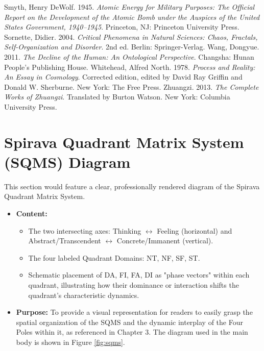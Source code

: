 \documentclass[11pt, a4paper]{article}
\begin{document}
\begin{thebibliography}{99}
 Smyth, Henry DeWolf. 1945. \textit{Atomic Energy for Military Purposes: The Official Report on the Development of the Atomic Bomb under the Auspices of the United States Government, 1940–1945}. Princeton, NJ: Princeton University Press.
 Sornette, Didier. 2004. \textit{Critical Phenomena in Natural Sciences: Chaos, Fractals, Self-Organization and Disorder}. 2nd ed. Berlin: Springer-Verlag.
 Wang, Dongyue. 2011. \textit{The Decline of the Human: An Ontological Perspective}. Changsha: Hunan People's Publishing House.
 Whitehead, Alfred North. 1978. \textit{Process and Reality: An Essay in Cosmology}. Corrected edition, edited by David Ray Griffin and Donald W. Sherburne. New York: The Free Press.
 Zhuangzi. 2013. \textit{The Complete Works of Zhuangzi}. Translated by Burton Watson. New York: Columbia University Press.

\end{thebibliography}

\appendix
\section{Spirava Quadrant Matrix System (SQMS) Diagram}
This section would feature a clear, professionally rendered diagram of the Spirava Quadrant Matrix System.
\begin{itemize}
    \item \textbf{Content:}
    \begin{itemize}
        \item The two intersecting axes: Thinking $\leftrightarrow$ Feeling (horizontal) and Abstract/Transcendent $\leftrightarrow$ Concrete/Immanent (vertical).
        \item The four labeled Quadrant Domains: NT, NF, SF, ST.
        \item Schematic placement of DA, FI, FA, DI as "phase vectors" within each quadrant, illustrating how their dominance or interaction shifts the quadrant's characteristic dynamics.
    \end{itemize}
    \item \textbf{Purpose:} To provide a visual representation for readers to easily grasp the spatial organization of the SQMS and the dynamic interplay of the Four Poles within it, as referenced in Chapter 3. The diagram used in the main body is shown in Figure \ref{fig:sqms}.
\end{itemize}
\end{document}
